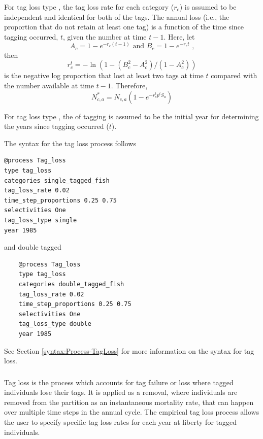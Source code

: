 For tag loss type , the tag loss rate  for each category ($r_c$) is assumed to be independent and identical for both of the tags. The annual loss (i.e., the proportion that do not retain at least one tag) is a function of the time since tagging occurred, $t$, given the number at time $t-1$. Here, let
\begin{equation}
	A_c = 1-e^{-r_c (t-1)} \text{\ and\ }
	B_c = 1-e^{-r_c t} \text{\ ,} 
\end{equation}
then 
\begin{equation}
	r^t_c = -\ln(1 - (B^2_c - A^2_c) / (1-A^2_c))
\end{equation}
is the negative log proportion that lost at least two tags at time $t$ compared with the number available at time $t-1$. Therefore, 
\begin{equation}
	N^*_{c,a} = N_{c,a} (1-e^{-r^t_c p^t S_a})
\end{equation}

For tag loss type , the  of tagging is assumed to be the initial year for determining the years since tagging occurred ($t$).

The syntax for the tag loss process follows

{\small{\begin{verbatim}
@process Tag_loss
type tag_loss
categories single_tagged_fish
tag_loss_rate 0.02
time_step_proportions 0.25 0.75
selectivities One
tag_loss_type single
year 1985
\end{verbatim}}}

and double tagged

{\small{\begin{verbatim}
	@process Tag_loss
	type tag_loss
	categories double_tagged_fish
	tag_loss_rate 0.02
	time_step_proportions 0.25 0.75
	selectivities One
	tag_loss_type double
	year 1985
\end{verbatim}}}

See Section \ref{syntax:Process-TagLoss} for more information on the syntax for tag loss.

\subsubsection{}\label{sec:Process-TagLossEmpirical} 

Tag loss is the process which accounts for tag failure or loss where tagged individuals lose their tags. It is applied as a removal, where individuals are removed from the partition as an instantaneous mortality rate, that can happen over multiple time steps in the annual cycle. The empirical tag loss process allows the user to specify specific tag loss rates for each year at liberty for tagged individuals.


